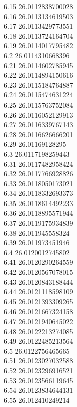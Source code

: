 {6.15	26.0112838700028\\
6.16	26.0113134619503\\
6.17	26.0113429773551\\
6.18	26.0113724164704\\
6.19	26.0114017795482\\
6.2	26.0114310668396\\
6.21	26.0114602785945\\
6.22	26.0114894150616\\
6.23	26.0115184764887\\
6.24	26.0115474631224\\
6.25	26.0115763752084\\
6.26	26.0116052129913\\
6.27	26.0116339767143\\
6.28	26.0116626666201\\
6.29	26.01169128295\\
6.3	26.0117198259443\\
6.31	26.0117482958424\\
6.32	26.0117766928826\\
6.33	26.0118050173021\\
6.34	26.0118332693373\\
6.35	26.0118614492233\\
6.36	26.0118895571944\\
6.37	26.0119175934839\\
6.38	26.011945558324\\
6.39	26.011973451946\\
6.4	26.0120012745802\\
6.41	26.0120290264559\\
6.42	26.0120567078015\\
6.43	26.0120843188444\\
6.44	26.0121118598109\\
6.45	26.0121393309265\\
6.46	26.0121667324158\\
6.47	26.0121940645022\\
6.48	26.0122213274085\\
6.49	26.0122485213564\\
6.5	26.0122756465665\\
6.51	26.0123027032588\\
6.52	26.0123296916521\\
6.53	26.0123566119645\\
6.54	26.0123834644131\\
6.55	26.012410249214\\
}
